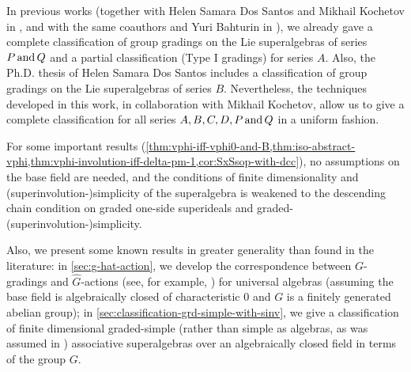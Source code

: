 \begin{prefatory}
\noindent
In previous works (together with Helen Samara Dos Santos and Mikhail Kochetov in \cite{paper-MAP}, and with the same coauthors and Yuri Bahturin in \cite{paper-Qn}), we already gave a complete classification of group gradings on the Lie superalgebras of series $P \,\text{and}\, Q$ and a partial classification (Type I gradings) for series $A$. 
Also, the Ph.D. thesis \cite{Helens_thesis} of Helen Samara Dos Santos includes a classification of group gradings on the Lie superalgebras of series $B$. 
Nevertheless, the techniques developed in this work, in collaboration with Mikhail Kochetov, allow us to give a complete classification for all series  $A, B, C, D, P \,\text{and}\, Q$ in a uniform fashion. 

\noindent 
For some important results (\cref{thm:vphi-iff-vphi0-and-B,thm:iso-abstract-vphi,thm:vphi-involution-iff-delta-pm-1,cor:SxSsop-with-dcc}), no assumptions on the base field are needed, and the conditions of finite dimensionality and (superinvolution-)simplicity of the superalgebra is weakened to the descending chain condition on graded one-side superideals and graded-(superinvolution-)simplicity. 

\noindent
Also, we present some known results in greater generality than found in the literature: 
in \cref{sec:g-hat-action}, we develop the correspondence between $G$-gradings and $\widehat G$-actions (see, for example, \cite[Section 1.4]{livromicha}) for universal algebras (assuming the base field is algebraically closed of characteristic $0$ and $G$ is a finitely generated abelian group); 
in \cref{sec:classification-grd-simple-with-sinv}, we give a classification of finite dimensional graded-simple (rather than simple as algebras, as was assumed in \cite{paper-MAP}) associative superalgebras over an algebraically closed field in terms of the group $G$. 



\tableofcontents%
%
%
\end{prefatory}
%
